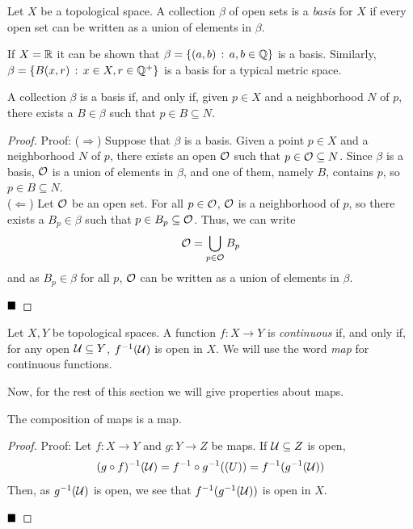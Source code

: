 
\begin{definition}
    Let $X$ be a topological space. A collection $\beta$ of open sets is a \emph{basis} for $X$ if every open set can be written as a union of elements in $\beta$. 
\end{definition}

If $X = \R$ it can be shown that $\beta = \{(a, b) \col a, b \in \Q\}$ is a basis. Similarly, $\beta = \{B(x, r) \col x \in X, r \in \Q^{+}\}$ is a basis for a typical metric space. 

\begin{lemma}
    A collection $\beta$ is a basis if, and only if, given $p \in X$ and a neighborhood $N$ of $p$, there exists a $B \in \beta$ such that $p \in B \subseteq N$. 
\end{lemma}
\begin{proof}{Proof:}
    ($\Rightarrow$) Suppose that $\beta$ is a basis. Given a point $p \in X$ and a neighborhood $N$ of $p$, there exists an open $\cal{O}$ such that $p \in \cal{O} \subseteq N$. Since $\beta$ is a basis, $\cal{O}$ is a union of elements in $\beta$, and one of them, namely $B$, contains $p$, so $p \in B \subseteq N$.\\

    ($\Leftarrow$) Let $\cal{O}$ be an open set. For all $p \in \cal{O}$, $\cal{O}$ is a neighborhood of $p$, so there exists a $B_{p} \in \beta$ such that $p \in B_{p} \subseteq \cal{O}$. Thus, we can write
    \[ \cal{O} = \bigcup_{p \in \cal{O}} B_{p} \]
    and as $B_{p} \in \beta$ for all $p$, $\cal{O}$ can be written as a union of elements in $\beta$. 

    $\qed$
\end{proof} 

\begin{definition}
    Let $X, Y$ be topological spaces. A function $f : X \to Y$ is \emph{continuous} if, and only if, for any open $\cal{U} \subseteq Y$, $f^{-1}(\cal{U})$ is open in $X$. We will use the word \emph{map} for continuous functions. 
\end{definition} 

Now, for the rest of this section we will give properties about maps. 

\begin{lemma}
    The composition of maps is a map.
\end{lemma}
\begin{proof}{Proof:}   
    Let $f : X \to Y$ and $g : Y \to Z$ be maps. If $\cal{U} \subseteq Z$ is open, 
    \[ (g \circ f)^{-1}(\cal{U}) = f^{-1} \circ g^{-1}(\cal(U)) = f^{-1}(g^{-1}(\cal{U})) \]
    Then, as $g^{-1}(\cal{U})$ is open, we see that $f^{-1}(g^{-1}(\cal{U}))$ is open in $X$.

    $\qed$
\end{proof}


